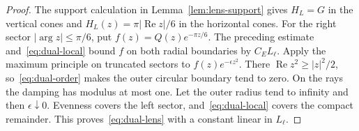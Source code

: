 \documentclass[11pt,a4paper]{article}
\numberwithin{equation}{section}
\theoremstyle{definition}
\theoremstyle{remark}
\begin{document}
\begin{proof}
The support calculation in Lemma~\ref{lem:lens-support} gives $H_L=G$ in the vertical cones and $H_L(z)=\pi|\operatorname{Re}z|/6$ in the horizontal cones. For the right sector $|\arg z|\le\pi/6$, put $f(z)=Q(z)e^{-\pi z/6}$. The preceding estimate and~\eqref{eq:dual-local} bound $f$ on both radial boundaries by $C_E L_\ell$. Apply the maximum principle on truncated sectors to $f(z)e^{-\epsilon z^2}$. There $\operatorname{Re}z^2\ge|z|^2/2$, so~\eqref{eq:dual-order} makes the outer circular boundary tend to zero. On the rays the damping has modulus at most one. Let the outer radius tend to infinity and then $\epsilon\downarrow0$. Evenness covers the left sector, and~\eqref{eq:dual-local} covers the compact remainder. This proves~\eqref{eq:dual-lens} with a constant linear in $L_\ell$.
\end{proof}
\end{document}
